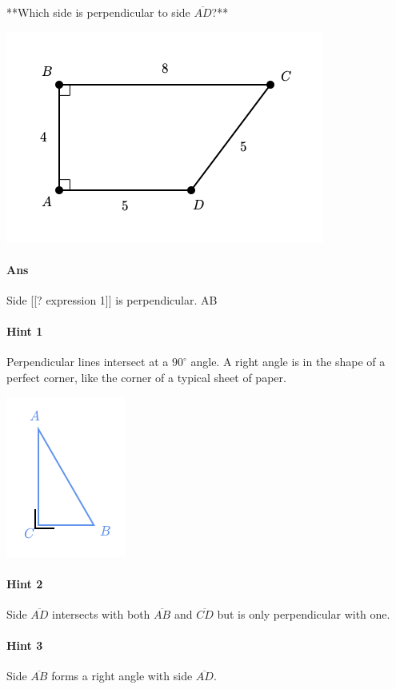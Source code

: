 \documentclass[twocolumn,10pt]{article}
\def\shrinkfactor{0.55}
\begin{document}
\noindent
**Which side is perpendicular to side $\overline{AD}$?**

\includegraphics[scale=\shrinkfactor]{figures/af1e22d3573a0a03d6cfa63d1c97705f69e1336c.png}

\paragraph{Ans} Side  [[? expression 1]] is perpendicular.
  AB

\paragraph{Hint 1}Perpendicular lines intersect at a $90 ^\circ$ angle.  
A right angle is in the shape of a perfect corner, like the corner of a typical sheet of paper.


\includegraphics[scale=\shrinkfactor]{figures/497661f48f441186b5e021d8ca8c4f0c7449214f.png}

\paragraph{Hint 2}Side $\overline{AD}$ intersects with both $\overline{AB}$ and $\overline{CD}$ but is only perpendicular with one.

\paragraph{Hint 3}Side $\overline{AB}$ forms a right angle with side $\overline{AD}$.
\end{document}
